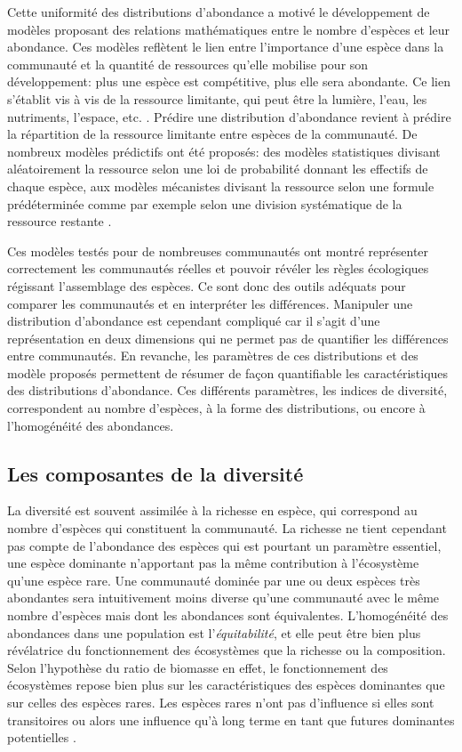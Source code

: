 \documentclass[
  11pt,
  french,
  A4paper,
  extrafontsizes,onecolumn,openright
  ]{memoir}
\begin{document}
Cette uniformité des distributions d'abondance a motivé le développement
de modèles proposant des relations mathématiques entre le nombre
d'espèces et leur abondance. Ces modèles reflètent le lien entre
l'importance d'une espèce dans la communauté et la quantité de
ressources qu'elle mobilise pour son développement: plus une espèce est
compétitive, plus elle sera abondante. Ce lien s'établit vis à vis de la
ressource limitante, qui peut être la lumière, l'eau, les nutriments,
l'espace, etc. \autocites{Silvertown2004}{TerSteege2006}. Prédire une
distribution d'abondance revient à prédire la répartition de la
ressource limitante entre espèces de la communauté. De nombreux modèles
prédictifs ont été proposés: des modèles statistiques divisant
aléatoirement la ressource selon une loi de probabilité donnant les
effectifs de chaque espèce, aux modèles mécanistes divisant la ressource
selon une formule prédéterminée comme par exemple selon une division
systématique de la ressource restante
\autocites{Fisher1943}{Motomura1932}{Tokeshi1993}{Magurran1988}.

Ces modèles testés pour de nombreuses communautés ont montré représenter
correctement les communautés réelles et pouvoir révéler les règles
écologiques régissant l'assemblage des espèces. Ce sont donc des outils
adéquats pour comparer les communautés et en interpréter les
différences. Manipuler une distribution d'abondance est cependant
compliqué car il s'agit d'une représentation en deux dimensions qui ne
permet pas de quantifier les différences entre communautés. En revanche,
les paramètres de ces distributions et des modèle proposés permettent de
résumer de façon quantifiable les caractéristiques des distributions
d'abondance. Ces différents paramètres, les indices de diversité,
correspondent au nombre d'espèces, à la forme des distributions, ou
encore à l'homogénéité des abondances.

\subsection{Les composantes de la
diversité}\label{les-composantes-de-la-diversite}

La diversité est souvent assimilée à la richesse en espèce, qui
correspond au nombre d'espèces qui constituent la communauté. La
richesse ne tient cependant pas compte de l'abondance des espèces qui
est pourtant un paramètre essentiel, une espèce dominante n'apportant
pas la même contribution à l'écosystème qu'une espèce rare. Une
communauté dominée par une ou deux espèces très abondantes sera
intuitivement moins diverse qu'une communauté avec le même nombre
d'espèces mais dont les abondances sont équivalentes. L'homogénéité des
abondances dans une population est l'\emph{équitabilité}, et elle peut
être bien plus révélatrice du fonctionnement des écosystèmes que la
richesse ou la composition. Selon l'hypothèse du ratio de biomasse en
effet, le fonctionnement des écosystèmes repose bien plus sur les
caractéristiques des espèces dominantes que sur celles des espèces
rares. Les espèces rares n'ont pas d'influence si elles sont
transitoires ou alors une influence qu'à long terme en tant que futures
dominantes potentielles \autocite{Grime1998}.
\end{document}
